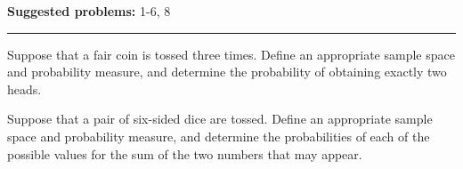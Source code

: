 \documentclass[12pt,reqno]{amsart}
\begin{document}
\textbf{Suggested problems:} 1-6, 8

\bigskip
\hrule

\bigskip

\prob Suppose that a fair coin is tossed three times. Define an appropriate sample space and probability measure, and determine the probability of obtaining exactly two heads.

\vfill

\prob Suppose that a pair of six-sided dice are tossed. Define an appropriate sample space and probability measure, and determine the probabilities of each of the possible values for the sum of the two numbers that may appear.

\vfill
\end{document}
